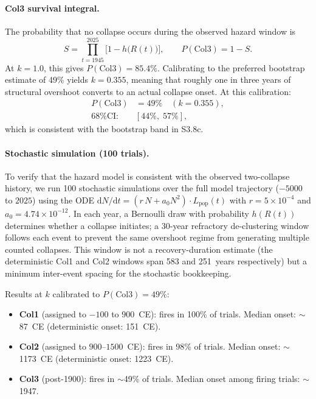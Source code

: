 \documentclass[11pt]{article}
\begin{document}
\paragraph{Col3 survival integral.}
The probability that no collapse occurs during the observed hazard window is
\begin{equation}
S = \prod_{t=1945}^{2025}\bigl[1 - h\bigl(R(t)\bigr)\bigr],
\qquad
P(\mathrm{Col3}) = 1 - S.
\label{eq:survival}
\end{equation}
At $k = 1.0$, this gives $P(\text{Col3}) = 85.4\%$.  Calibrating to the
preferred bootstrap estimate of 49\% yields $k = 0.355$, meaning that
roughly one in three years of structural overshoot converts to an
actual collapse onset.  At this calibration:
\begin{align}
P(\text{Col3}) &= 49\% \quad (k = 0.355), \\
\text{68\% CI:}\quad &[44\%,\; 57\%],
\end{align}
which is consistent with the bootstrap band in S3.8c.

\paragraph{Stochastic simulation (100 trials).}
To verify that the hazard model is consistent with the observed
two-collapse history, we run 100 stochastic simulations over the full
model trajectory ($-5000$ to $2025$) using the ODE
$\mathrm{d}N/\mathrm{d}t = (r\,N + a_0 N^2)\cdot L_{\mathrm{pop}}(t)$
with $r = 5 \times 10^{-4}$ and $a_0 = 4.74 \times 10^{-12}$.
In each year, a Bernoulli draw with probability $h(R(t))$ determines
whether a collapse initiates; a 30-year refractory de-clustering window
follows each event to prevent the same overshoot regime from generating
multiple counted collapses.  This window is not a recovery-duration
estimate (the deterministic Col1 and Col2 windows span 583 and 251~years
respectively) but a minimum inter-event spacing for the stochastic
bookkeeping.

Results at $k$ calibrated to $P(\text{Col3}) = 49\%$:
\begin{itemize}[leftmargin=2em]
\item \textbf{Col1} (assigned to $-100$ to $900$~CE): fires in 100\%
      of trials.  Median onset: $\sim$87~CE
      (deterministic onset: 151~CE).
\item \textbf{Col2} (assigned to $900$--$1500$~CE): fires in 98\%
      of trials.  Median onset: $\sim$1173~CE
      (deterministic onset: 1223~CE).
\item \textbf{Col3} (post-1900): fires in $\sim$49\% of trials.
      Median onset among firing trials: $\sim$1947.
\end{itemize}
\end{document}
